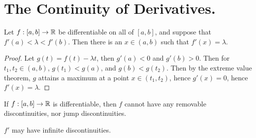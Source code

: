 
\section{The Continuity of Derivatives.}

\begin{theorem}\label{6.3.1}
    Let $f:[a,b] \rightarrow \mathbb{R}$ be differentiable on all of  $[a,b]$, and suppose that
    $f'(a)<\lambda<f'(b)$. Then there is an  $x \in (a,b)$ such that $f'(x)=\lambda$.
\end{theorem}
\begin{proof}
    Let $g(t)=f(t)-\lambda t$, then  $g'(a)<0$ and  $g'(b)>0$. Then for  $t_1,t_2 \in (a,b)$,
    $g(t_1)<g(a)$, and $g(b)<g(t_2)$. Then by the extreme value theorem, $g$ attains a maximum at
    a point  $x \in (t_1,t_2)$, hence $g'(x)=0$, hence  $f'(x)=\lambda$.
\end{proof}

\begin{corollary}
    If $f:[a,b] \rightarrow \mathbb{R}$ is differentiable, then  $f$ cannot have any removable discontinuities,
    nor jump discontinuities.
\end{corollary}

\begin{remark}
    $f'$ may have infinite discontinuities.
\end{remark}
